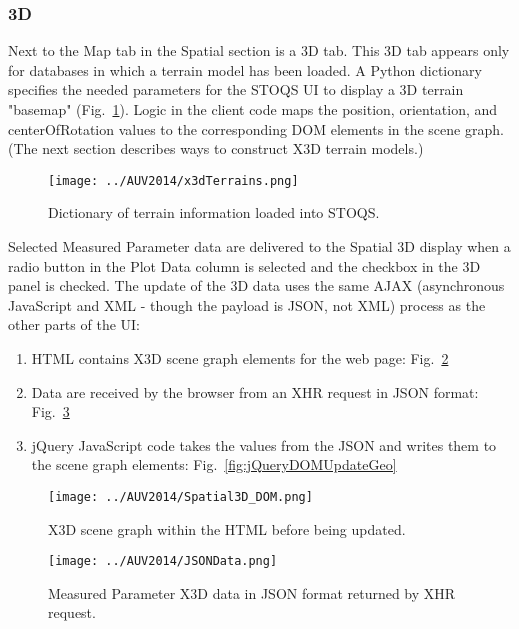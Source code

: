 \documentclass[conference]{IEEEtran}
\begin{document}
\subsubsection{3D}
Next to the Map tab in the Spatial section is a 3D tab. This 3D tab appears only for databases in which a terrain model has been loaded. A Python dictionary specifies the needed parameters for the STOQS UI to display a 3D terrain "basemap" (Fig.~\ref{fig:x3dTerrains}). Logic in the client code maps the position, orientation, and centerOfRotation values to the corresponding DOM elements in the scene graph. (The next section describes ways to construct X3D terrain models.)

\begin{figure}[htbp]
\centering
\texttt{[image: ../AUV2014/x3dTerrains.png]}
\caption{Dictionary of terrain information loaded into STOQS.}
\label{fig:x3dTerrains}
\end{figure}

Selected Measured Parameter data are delivered to the Spatial 3D display when a radio button in the Plot Data column is selected and the checkbox in the 3D panel is checked. The update of the 3D data uses the same AJAX (asynchronous JavaScript and XML - though the payload is JSON, not XML) process as the other parts of the UI:

\begin{enumerate}
\item HTML contains X3D scene graph elements for the web page: Fig.~\ref{fig:Spatial3D_DOM}
\item Data are received by the browser from an XHR request in JSON format: Fig.~\ref{fig:JSONData}
\item jQuery JavaScript code takes the values from the JSON and writes them to the scene graph elements: Fig.~\ref{fig:jQueryDOMUpdateGeo}
\end{enumerate}

\begin{figure}[!htbp]
\centering
\texttt{[image: ../AUV2014/Spatial3D\_DOM.png]}
\caption{X3D scene graph within the HTML before being updated.}
\label{fig:Spatial3D_DOM}
\end{figure}

\begin{figure}[!htbp]
\centering
\texttt{[image: ../AUV2014/JSONData.png]}
\caption{Measured Parameter X3D data in JSON format returned by XHR request.}
\label{fig:JSONData}
\end{figure}
\end{document}
